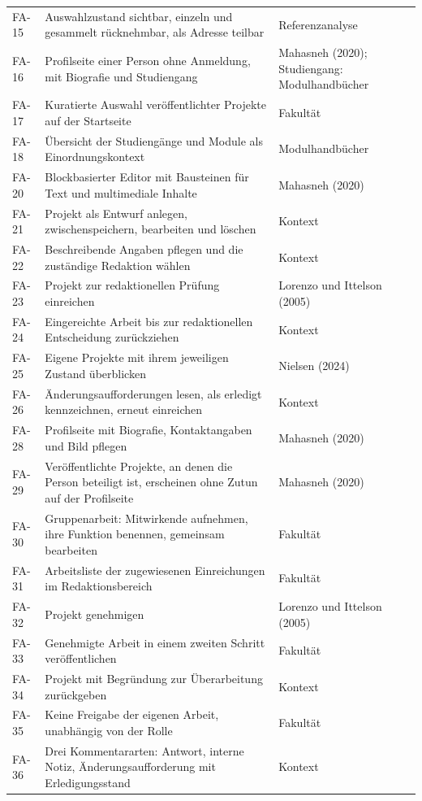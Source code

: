 \begin{longtable}{@{}L{1.5cm}L{9.2cm}L{3.8cm}@{}}
	FA-15 & Auswahlzustand sichtbar, einzeln und gesammelt rücknehmbar, als Adresse teilbar & Referenzanalyse \\
	FA-16 & Profilseite einer Person ohne Anmeldung, mit Biografie und Studiengang & Mahasneh (2020); Studiengang: Modulhandbücher \\
	FA-17 & Kuratierte Auswahl veröffentlichter Projekte auf der Startseite & Fakultät \\
	FA-18 & Übersicht der Studiengänge und Module als Einordnungskontext & Modulhandbücher \\
	FA-20 & Blockbasierter Editor mit Bausteinen für Text und multimediale Inhalte & Mahasneh (2020) \\
	FA-21 & Projekt als Entwurf anlegen, zwischenspeichern, bearbeiten und löschen & Kontext \\
	FA-22 & Beschreibende Angaben pflegen und die zuständige Redaktion wählen & Kontext \\
	FA-23 & Projekt zur redaktionellen Prüfung einreichen & Lorenzo und Ittelson (2005) \\
	FA-24 & Eingereichte Arbeit bis zur redaktionellen Entscheidung zurückziehen & Kontext \\
	FA-25 & Eigene Projekte mit ihrem jeweiligen Zustand überblicken & Nielsen (2024) \\
	FA-26 & Änderungsaufforderungen lesen, als erledigt kennzeichnen, erneut einreichen & Kontext \\
	FA-28 & Profilseite mit Biografie, Kontaktangaben und Bild pflegen & Mahasneh (2020) \\
	FA-29 & Veröffentlichte Projekte, an denen die Person beteiligt ist, erscheinen ohne Zutun auf der Profilseite & Mahasneh (2020) \\
	FA-30 & Gruppenarbeit: Mitwirkende aufnehmen, ihre Funktion benennen, gemeinsam bearbeiten & Fakultät \\
	FA-31 & Arbeitsliste der zugewiesenen Einreichungen im Redaktionsbereich & Fakultät \\
	FA-32 & Projekt genehmigen & Lorenzo und Ittelson (2005) \\
	FA-33 & Genehmigte Arbeit in einem zweiten Schritt veröffentlichen & Fakultät \\
	FA-34 & Projekt mit Begründung zur Überarbeitung zurückgeben & Kontext \\
	FA-35 & Keine Freigabe der eigenen Arbeit, unabhängig von der Rolle & Fakultät \\
	FA-36 & Drei Kommentararten: Antwort, interne Notiz, Änderungsaufforderung mit Erledigungsstand & Kontext \\

\end{longtable}
